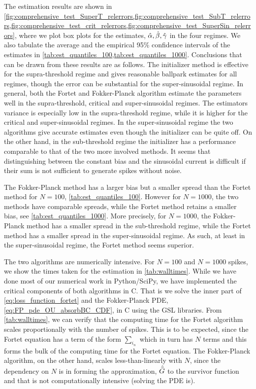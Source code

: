 The estimation results are shown in
\cref{fig:comprehensive_test_SuperT_relerrors,fig:comprehensive_test_SubT_relerrors,fig:comprehensive_test_crit_relerrors,fig:comprehensive_test_SuperSin_relerrors},
where we plot box plots for the estimates, ${{{ \hat{\alpha} }, { \hat{\beta} }, { \hat{{\gamma }} }} }$ in the four regimes. We
also tabulate the average and the empirical 95\% confidence intervals of the
estimates in \cref{tab:est_quantiles_100,tab:est_quantiles_1000}. Conclusions
that can be drawn from these results are as follows. The initializer method is
effective for the supra-threshold regime and gives reasonable ballpark estimates
for all regimes, though the error can be substantial for the super-sinusoidal
regime. In general, both the Fortet and Fokker-Planck algorithm estimate the
parameters well in the supra-threshold, critical and super-sinusoidal regimes.
The estimators variance is especially low in the supra-threshold regime, while
it is higher for the critical and super-sinusoidal regimes. In the
super-sinusoidal regime the two algorithms give accurate estimates even though
the initializer can be quite off. On the other hand, in the sub-threshold regime
the initializer has a performance comparable to that of the two more involved
methods. It seems that distinguishing between the constant bias and the
sinusoidal current is difficult if their sum is not sufficient to generate
spikes without noise.


The Fokker-Planck method has a larger bias but a smaller spread than the Fortet
method for $N=100$, \cref{tab:est_quantiles_100}. However for
$N=1000$, the two methods have comparable 
spreads, while the Fortet method retains a smaller bias, see
\cref{tab:est_quantiles_1000}. More precisely, for $N=1000$, the Fokker-Planck
method has a smaller spread in the sub-threshold regime, while the Fortet method
has a smaller spread in the super-sinusoidal regime. As such, at least in the
super-sinusoidal regime, the Fortet method seems superior.

The two algorithms are numerically intensive. For $N=100$ and $N=1000$ spikes,
we show the times taken for the estimation in \cref{tab:walltimes}. While we
have done most of our numerical work in Python/SciPy\cite{scipy}, we have
implemented the critical components of both algorithms in C. That is we solve
the inner part of \cref{eq:loss_function_fortet} and the Fokker-Planck PDE,
\cref{eq:FP_pde_OU_absorbBC_CDF}, in C using the GSL libraries\cite{gsl}. From
\cref{tab:walltimes}, we can verify that the computing time for the Fortet
algorithm scales proportionally with the number of spikes. This is to be
expected, since the Fortet equation has a term of the form $\sum_{i_n}$ which in
turn has $N$ terms and this forms the bulk of the computing time for the
Fortet equation. The Fokker-Planck algorithm, on the other hand, scales
less-than-linearly with $N$, since the dependency on $N$ is in forming the
approximation, ${ \hat{{ \bar{G} }} }$ to the survivor function and that is not computationally
intensive (solving the PDE is).


